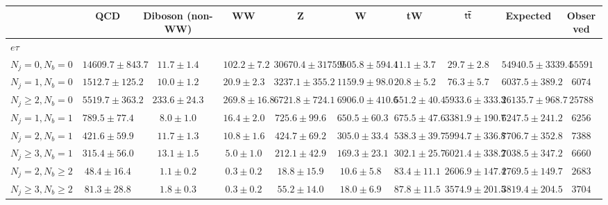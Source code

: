 

    \begin{tabular}{l|ccccccc|cc}
        \hline
                                        & QCD                  & Diboson (non-WW) & WW               & Z                      & W                    & tW                & $\sf t\bar{t}$     & Expected               & Observed \\
        \hline
        \multicolumn{10}{l}{$e\tau$}   \\
        \hline
        $N_{j} = 0, N_{b} = 0$          & $14609.7 \pm 843.7$  & $11.7 \pm 1.4$   & $102.2 \pm 7.2$  & $30670.4 \pm 3175.9$   & $9505.8 \pm 594.4$   & $11.1 \pm 3.7$    & $29.7 \pm 2.8$     & $54940.5 \pm 3339.4$   & $55591$  \\
        $N_{j} = 1, N_{b} = 0$          & $1512.7 \pm 125.2$   & $10.0 \pm 1.2$   & $20.9 \pm 2.3$   & $3237.1 \pm 355.2$     & $1159.9 \pm 98.0$    & $20.8 \pm 5.2$    & $76.3 \pm 5.7$     & $6037.5 \pm 389.2$     & $6074$   \\
        $N_{j} \geq 2, N_{b} = 0$       & $5519.7 \pm 363.2$   & $233.6 \pm 24.3$ & $269.8 \pm 16.8$ & $6721.8 \pm 724.1$     & $6906.0 \pm 410.6$   & $551.2 \pm 40.4$  & $5933.6 \pm 333.3$ & $26135.7 \pm 968.7$    & $25788$  \\
        $N_{j} = 1, N_{b} = 1$          & $789.5 \pm 77.4$     & $8.0 \pm 1.0$    & $16.4 \pm 2.0$   & $725.6 \pm 99.6$       & $650.5 \pm 60.3$     & $675.5 \pm 47.6$  & $3381.9 \pm 190.7$ & $6247.5 \pm 241.2$     & $6256$   \\
        $N_{j} = 2, N_{b} = 1$          & $421.6 \pm 59.9$     & $11.7 \pm 1.3$   & $10.8 \pm 1.6$   & $424.7 \pm 69.2$       & $305.0 \pm 33.4$     & $538.3 \pm 39.7$  & $5994.7 \pm 336.8$ & $7706.7 \pm 352.8$     & $7388$   \\
        $N_{j} \geq 3, N_{b} = 1$       & $315.4 \pm 56.0$     & $13.1 \pm 1.5$   & $5.0 \pm 1.0$    & $212.1 \pm 42.9$       & $169.3 \pm 23.1$     & $302.1 \pm 25.7$  & $6021.4 \pm 338.2$ & $7038.5 \pm 347.2$     & $6660$   \\
        $N_{j} = 2, N_{b} \geq 2$       & $48.4 \pm 16.4$      & $1.1 \pm 0.2$    & $0.3 \pm 0.2$    & $18.8 \pm 15.9$        & $10.6 \pm 5.8$       & $83.4 \pm 11.1$   & $2606.9 \pm 147.4$ & $2769.5 \pm 149.7$     & $2683$   \\
        $N_{j} \geq 3, N_{b} \geq 2$    & $81.3 \pm 28.8$      & $1.8 \pm 0.3$    & $0.3 \pm 0.2$    & $55.2 \pm 14.0$        & $18.0 \pm 6.9$       & $87.8 \pm 11.5$   & $3574.9 \pm 201.5$ & $3819.4 \pm 204.5$     & $3704$   \\

\end{tabular}
